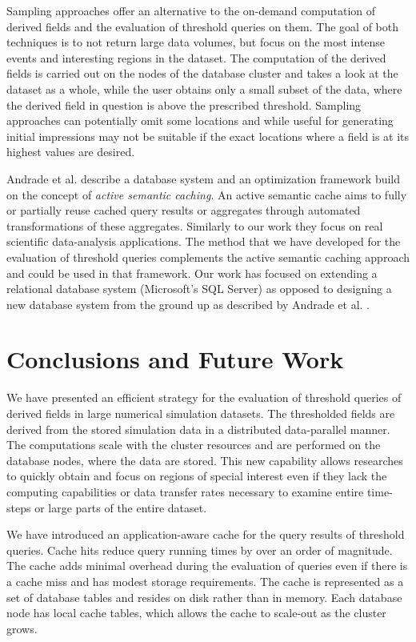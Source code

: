 \documentclass{sig-alternate}
\begin{document}
Sampling approaches \cite{Sidirourgos, Nirkhiwale} offer an alternative to the on-demand computation of derived fields and the evaluation of threshold queries
on them. The goal of both techniques is to not return large data volumes, but focus on the most intense events and interesting regions in the dataset. 
The computation of the derived fields is carried out on the nodes of the database cluster and takes a look at the dataset as a whole, while the user obtains only
a small subset of the data, where the derived field in question is above the prescribed threshold. Sampling approaches can potentially omit some locations and
while useful for generating initial impressions may not be suitable if the exact locations where a field is at its highest values are desired.

Andrade et al. \cite{Andrade} describe a database system and an optimization framework build on the concept of \emph{active semantic caching}. An
active semantic cache aims to fully or partially reuse cached query results or aggregates through automated transformations of these aggregates. Similarly
to our work they focus on real scientific data-analysis applications. The method that we have developed for the evaluation of threshold queries complements
the active semantic caching approach and could be used in that framework. Our work has focused on extending a relational database system (Microsoft's SQL
Server) as opposed to designing a new database system from the ground up as described by Andrade et al. \cite{Andrade}.

\section{Conclusions and Future Work}

We have presented an efficient strategy for the evaluation of threshold queries of derived fields in large numerical simulation datasets. 
The thresholded fields are derived from the stored simulation data in a distributed data-parallel manner. The computations
scale with the cluster resources and are performed on the database nodes, where the data are stored. This new capability allows researches to quickly
obtain and focus on regions of special interest even if they lack the computing capabilities or data transfer rates necessary to examine entire time-steps
or large parts of the entire dataset. 

We have introduced an application-aware cache for the query results of threshold queries. Cache hits reduce query running times by over an order of
magnitude. The cache adds minimal overhead during the evaluation of queries even if there is
a cache miss and has modest storage requirements. The cache is represented as a set of database tables and resides on disk rather than in memory. 
Each database node has local cache tables, which allows the cache to scale-out as the cluster grows.
\end{document}
